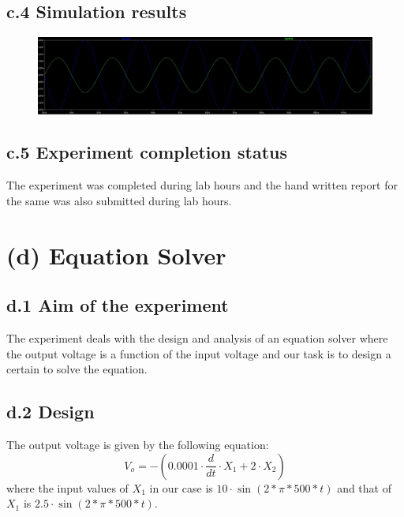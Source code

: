 \documentclass[12pt]{article}
\begin{document}
\subsection*{c.4 Simulation results}%
\begin{figure}[h!]
\centering
\includegraphics[scale = 0.6]{Sim_1_c.jpg}
\end{figure}

\subsection*{c.5 Experiment completion status}
The experiment was completed during lab hours and the hand written report for the same was also submitted during lab hours.





\newpage

\section*{(d) Equation Solver}
\subsection*{d.1 Aim of the experiment}
The experiment deals with the design and analysis of an equation solver where the output voltage is a function of the input voltage and our task is to design a certain to solve the equation. 

\subsection*{d.2 Design}
The output voltage is given by the following equation:
 \begin{equation}
     V_{o} = - (0.0001\cdot\frac{d}{dt}\cdot X_{1} + 2\cdot X_{2})
 \end{equation}     
 where the input values of $X_{1}$ in our case is $10\cdot\sin(2*\pi*500*t)$ and that of $X_{1}$ is $2.5\cdot\sin(2*\pi*500*t)$.
\end{document}
